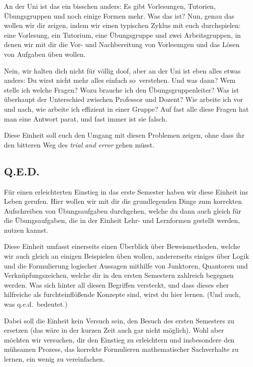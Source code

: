 An der Uni ist das ein bisschen anders: Es gibt Vorlesungen, Tutorien,
Übungsgruppen und noch einige Formen mehr. Was das ist? Nun, genau das wollen
wir dir zeigen, indem wir einen typischen Zyklus mit euch durchspielen: eine
Vorlesung, ein Tutorium, eine Übungsgruppe und zwei Arbeitsgruppen, in denen
wir mit dir die Vor- und Nachbereitung von Vorlesungen und das Lösen von
Aufgaben üben wollen.

Nein, wir halten dich nicht für völlig doof, aber an der Uni ist eben alles
etwas anders: Du wirst nicht mehr alles \glqq einfach so\grqq\ verstehen. Und
was dann? Wem stelle ich welche Fragen? Wozu brauche ich den
Übungsgruppenleiter? Was ist überhaupt der Unterschied zwischen Professor und
Dozent? Wie arbeite ich vor und nach, wie arbeite ich effizient in einer
Gruppe? Auf fast alle diese Fragen hat man eine Antwort parat, und fast immer
ist sie falsch.

Diese Einheit soll euch den Umgang mit diesen Problemen zeigen, ohne dass ihr
den bitteren Weg des {\it trial and error} gehen müsst.

\subsection*{Q.E.D.}

Für einen erleichterten Einstieg in das erste Semester haben wir diese Einheit
ins Leben gerufen. Hier wollen wir mit dir die grundlegenden Dinge zum
korrekten Aufschreiben von Übungsaufgaben durchgehen, welche du dann auch
gleich für die Übungsaufgaben, die in der Einheit Lehr- und Lernformen gestellt
werden, nutzen kannst.

Diese Einheit umfasst einerseits einen Überblick über Beweismethoden, welche
wir auch gleich an einigen Beispielen üben wollen, andererseits einiges über
Logik und die Formulierung logischer Aussagen mithilfe von Junktoren, Quantoren
und Verknüpfungszeichen, welche dir in den ersten Semestern zahlreich begegnen
werden. Was sich hinter all diesen Begriffen versteckt, und dass dieses eher
hilfreiche als furchteinflößende Konzepte sind, wirst du hier lernen. (Und
auch, was \glqq q.e.d.\grqq\ bedeutet.)

Dabei soll die Einheit kein Versuch sein, den Besuch des ersten Semesters zu
ersetzen (das wäre in der kurzen Zeit auch gar nicht möglich). Wohl aber
möchten wir versuchen, dir den Einstieg zu erleichtern und insbesondere den
mühsamen Prozess, das korrekte Formulieren mathematischer Sachverhalte zu
lernen, ein wenig zu vereinfachen.

